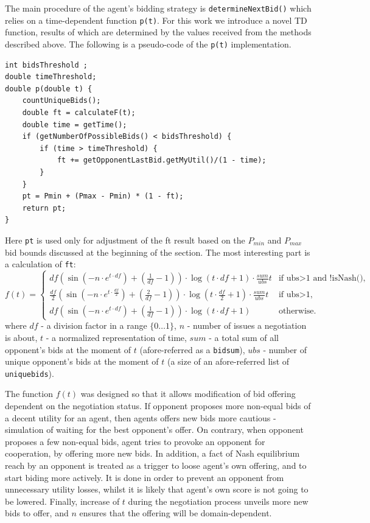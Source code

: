 \documentclass[html]{report}    %
\begin{document}
The main procedure of the agent's bidding strategy is \texttt{determineNextBid()} which relies on a time-dependent function \texttt{p(t)}. For this work we introduce a novel TD function, results of which are determined by the values received from the methods described above. The following is a pseudo-code of the \texttt{p(t)} implementation.
\begin{verbatim}
int bidsThreshold ;
double timeThreshold;
double p(double t) {
    countUniqueBids();
    double ft = calculateF(t);
    double time = getTime();
    if (getNumberOfPossibleBids() < bidsThreshold) {
        if (time > timeThreshold) {
            ft += getOpponentLastBid.getMyUtil()/(1 - time);
        }
    }
    pt = Pmin + (Pmax - Pmin) * (1 - ft);
    return pt;
}
\end{verbatim}
Here \texttt{pt} is used only for adjustment of the ft result based on the $P_{min}$ and $P_{max}$ bid bounds discussed at the beginning of the section. The most interesting part is a calculation of \texttt{ft}:
\begin{equation} \label{1}
	f(t) = \begin{cases}
			df(\sin(-n\cdot e^{t\cdot df})+(\frac{1}{df}-1))\cdot\log(t\cdot df+1)\cdot\frac{sum}{ubs}t &\text{if ubs$>$1 and !isNash(),}\\
			\frac{df}{2}(\sin(-n\cdot e^{t\cdot\frac{df}{2}})+(\frac{2}{df}-1))\cdot\log(t\cdot \frac{df}{2}+1)\cdot\frac{sum}{ubs}t &\text{if ubs$>$1,}\\
			df(\sin(-n\cdot e^{t\cdot df})+(\frac{1}{df}-1))\cdot\log(t\cdot df+1) &\text{otherwise.}
			\end{cases}
\end{equation}
where $df$ - a division factor in a range $\{0\dots1\}$, $n$ - number of issues a negotiation is about, $t$ - a normalized representation of time, $sum$ - a total sum of all opponent's bids at the moment of $t$ (afore-referred as a \texttt{bidsum}), $ubs$ - number of unique opponent's bids at the moment of $t$ (a size of an afore-referred list of \texttt{uniquebids}).

The function $f(t)$ was designed so that it allows modification of bid offering dependent on the negotiation status. If opponent proposes more non-equal bids of a decent utility for an agent, then agents offers new bids more cautious - simulation of waiting for the best opponent's offer. On contrary, when opponent proposes a few non-equal bids, agent tries to provoke an opponent for cooperation, by offering more new bids. In addition, a fact of Nash equilibrium reach by an opponent is treated as a trigger to loose agent's own offering, and to start biding more actively. It is done in order to prevent an opponent from unnecessary utility losses, whilst it is likely that agent's own score is not going to be lowered. Finally, increase of $t$ during the negotiation process unveils more new bids to offer, and $n$ ensures that the offering will be domain-dependent.
\end{document}
